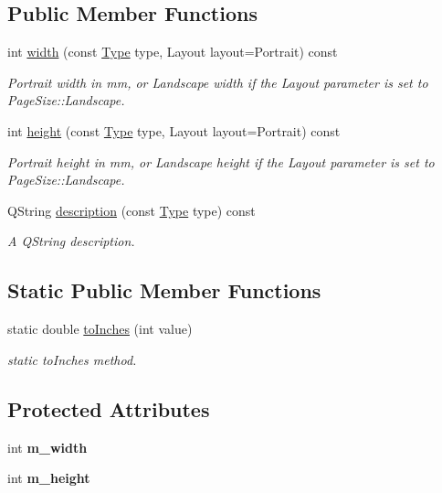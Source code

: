 \subsection*{Public Member Functions}
\begin{DoxyCompactItemize}
\item 
int \mbox{\hyperlink{classPaperSize_ac19b82ac30b91bc4223a333a2631f65e}{width}} (const \mbox{\hyperlink{classPaperSize_a0c3744aab15a171ac1681788f7169ed8}{Type}} type, Layout layout=Portrait) const
\begin{DoxyCompactList}\small\item\em Portrait width in mm, or Landscape width if the {\ttfamily Layout} parameter is set to {\ttfamily Page\+Size\+::\+Landscape}. \end{DoxyCompactList}\item 
int \mbox{\hyperlink{classPaperSize_a185becbda27217b5df2bccc27f29bf4b}{height}} (const \mbox{\hyperlink{classPaperSize_a0c3744aab15a171ac1681788f7169ed8}{Type}} type, Layout layout=Portrait) const
\begin{DoxyCompactList}\small\item\em Portrait height in mm, or Landscape height if the {\ttfamily Layout} parameter is set to {\ttfamily Page\+Size\+::\+Landscape}. \end{DoxyCompactList}\item 
Q\+String \mbox{\hyperlink{classPaperSize_a829638b64da7c339430b9737e438c073}{description}} (const \mbox{\hyperlink{classPaperSize_a0c3744aab15a171ac1681788f7169ed8}{Type}} type) const
\begin{DoxyCompactList}\small\item\em A {\ttfamily Q\+String} description. \end{DoxyCompactList}\end{DoxyCompactItemize}
\subsection*{Static Public Member Functions}
\begin{DoxyCompactItemize}
\item 
static double \mbox{\hyperlink{classPaperSize_ac4b94da1c955bcf6b733d99f3b3a416d}{to\+Inches}} (int value)
\begin{DoxyCompactList}\small\item\em static {\ttfamily to\+Inches} method. \end{DoxyCompactList}\end{DoxyCompactItemize}
\subsection*{Protected Attributes}
\begin{DoxyCompactItemize}
\item 
\mbox{\label{classPaperSize_af106846b56d573825b539cf717c93451}} 
int {\bfseries m\+\_\+width}
\item 
\mbox{\label{classPaperSize_a53ee9ed8b02d81938dd8546466d72326}} 
int {\bfseries m\+\_\+height}
\end{DoxyCompactItemize}


